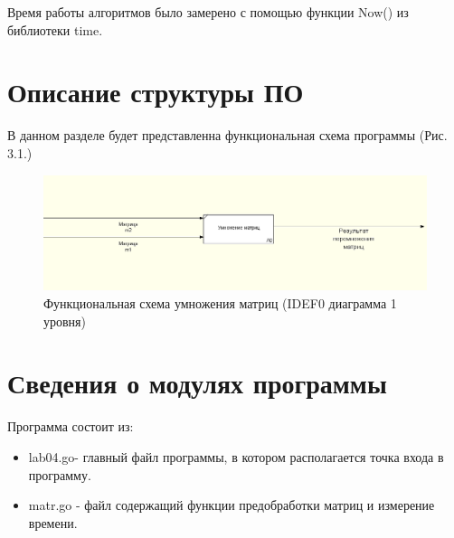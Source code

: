 \documentclass[12pt]{report}
\begin{document}
Время работы алгоритмов было замерено с помощью функции Now() из библиотеки time.

\section{Описание структуры ПО}
В данном разделе будет представленна функциональная схема программы (Рис. 3.1.)
\begin{figure}[h]
	\centering
	\includegraphics[width=1.25\linewidth]{lab02ram}
	\caption{Функциональная схема умножения матриц (IDEF0 диаграмма 1 уровня)}
	\label{fig:mpr}
\end{figure}

\section{Сведения о модулях программы}
Программа состоит из:
\begin{itemize}
	\item lab04.go- главный файл программы, в котором располагается точка входа в программу.
	\item matr.go - файл содержащий функции предобработки матриц и измерение времени.
\end{itemize}
\end{document}
